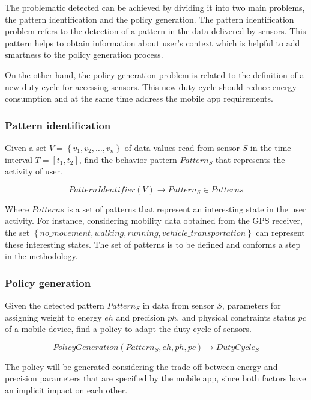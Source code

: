 The problematic detected can be achieved by dividing it into two main problems, the pattern identification and the policy generation.
The pattern identification problem refers to the detection of a pattern in the data delivered by sensors.
This pattern helps to obtain information about user's context which is helpful to add smartness to the policy generation process.

On the other hand, the policy generation problem is related to the definition of a new duty cycle for accessing sensors.
This new duty cycle should reduce energy consumption and at the same time address the mobile app requirements.
\subsubsection{Pattern identification}
\label{ssub:pattern_identification}
Given a set $V = \left\{v_{1}, v_{2}, \dotsc, v_{n}\right\}$ of data values read from sensor $S$ in the time interval $T = [t_{1}, t_{2}]$, find the behavior pattern $Pattern_{S}$ that represents the activity of user.

\begin{equation}
  PatternIdentifier( V ) \longrightarrow{} Pattern_{S} \in Patterns
\end{equation}

Where $Patterns$ is a set of patterns that represent an interesting state in the user activity.
For instance, considering mobility data obtained from the GPS receiver, the set $\left\{no\_movement, walking, running, vehicle\_transportation\right\}$ can represent these interesting states.
The set of patterns is to be defined and conforms a step in the methodology.


\subsubsection{Policy generation}
\label{ssub:policy_generation}

Given the detected pattern $Pattern_{S}$ in data from sensor $S$, parameters for assigning weight to energy $eh$ and precision $ph$, and physical constraints status $pc$ of a mobile device, find a policy to adapt the duty cycle of sensors.

\begin{equation}
  PolicyGeneration( Pattern_{S}, eh, ph, pc ) \longrightarrow{} DutyCycle_{S}
\end{equation}

The policy will be generated considering the trade-off between energy and precision parameters that are specified by the mobile app, since both factors have an implicit impact on each other.


